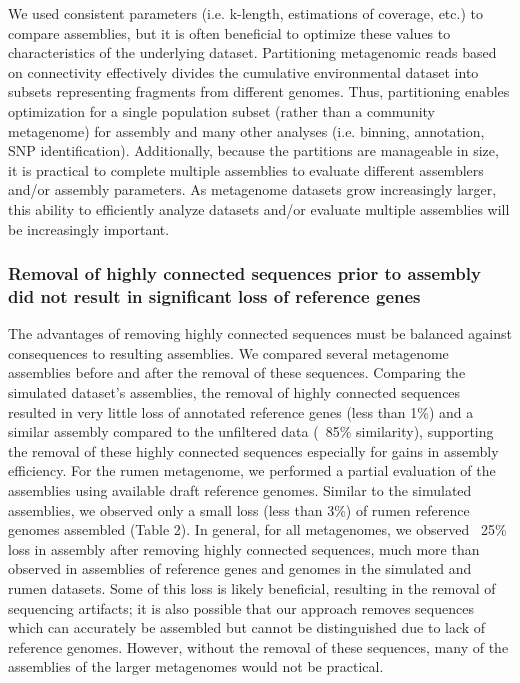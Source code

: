 \documentclass[10pt]{article}
\begin{document}
We used consistent parameters (i.e. k-length, estimations of coverage,
etc.) to compare assemblies, but it is often beneficial to optimize
these values to characteristics of the underlying dataset.
Partitioning metagenomic reads based on connectivity effectively
divides the cumulative environmental dataset into subsets representing
fragments from different genomes.  Thus, partitioning enables
optimization for a single population subset (rather than a community
metagenome) for assembly and many other analyses (i.e. binning,
annotation, SNP identification).  Additionally, because the partitions
are manageable in size, it is practical to complete multiple
assemblies to evaluate different assemblers and/or assembly
parameters.  As metagenome datasets grow increasingly larger, this
ability to efficiently analyze datasets and/or evaluate multiple
assemblies will be increasingly important.

\subsubsection*{Removal of highly connected sequences prior to assembly did not result in significant loss of reference genes}
The advantages of removing highly connected sequences must be balanced
against consequences to resulting assemblies.  We compared several
metagenome assemblies before and after the removal of these sequences.
Comparing the simulated dataset's assemblies, the removal of highly
connected sequences resulted in very little loss of annotated
reference genes (less than 1\%) and a similar assembly compared to the
unfiltered data (~85\% similarity), supporting the removal of these
highly connected sequences especially for gains in assembly
efficiency.  For the rumen metagenome, we performed a partial
evaluation of the assemblies using available draft reference genomes.
Similar to the simulated assemblies, we observed only a small loss
(less than 3\%) of rumen reference genomes assembled (Table 2).  In
general, for all metagenomes, we observed ~25\% loss in assembly after
removing highly connected sequences, much more than observed in
assemblies of reference genes and genomes in the simulated and rumen
datasets.  Some of this loss is likely beneficial, resulting in the
removal of sequencing artifacts; it is also possible that our approach
removes sequences which can accurately be assembled but cannot be
distinguished due to lack of reference genomes.  However, without the
removal of these sequences, many of the assemblies of the larger
metagenomes would not be practical.
\end{document}
